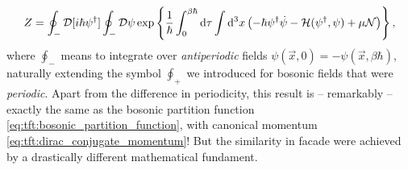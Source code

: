 \begin{equation}
	Z = \oint_- \mathcal{D} [i \hbar \psi^\dagger] \oint_- \mathcal{D} \psi \exp \left\{ \frac{1}{\hbar} \int_0^{\beta \hbar} \mathop{}\!\mathrm{d} \tau \int \mathop{}\!\mathrm{d}^3 x \left( -\hbar \psi^\dagger \dot{\psi} - \mathcal{H} ( \psi^\dagger, \psi ) + \mu \mathcal{N} \right) \right\} ,
\label{eq:tft:fermion_partition_function}
\end{equation}
where $\oint_-$ means to integrate over \emph{antiperiodic} fields $\psi(\vec{x}, 0) = -\psi(\vec{x}, \beta \hbar)$, naturally extending the symbol $\oint_+$ we introduced for bosonic fields that were \emph{periodic}.
Apart from the difference in periodicity, this result is -- remarkably -- exactly the same as the bosonic partition function \eqref{eq:tft:bosonic_partition_function}, with canonical momentum \eqref{eq:tft:dirac_conjugate_momentum}!
But the similarity in facade were achieved by a drastically different mathematical fundament.


\iffalse
The partition function is therefore
\begin{equation}
\begin{split}
	Z &= \int \dif \psi_0^\dagger \int \dif \psi_0 \, e^{-\psi_{n+1}^\dagger \psi_{n+1}} \braket{-\psi_0 | e^{-\beta(\hat{H} - \mu \hat{N})} | \psi_0} \\
	  &= \prod_n \int \dif \psi_n^\dagger \int \dif \psi_n \, e^{-\psi_{n+1}^\dagger \psi_{n+1}} \braket{\psi_{n+1} | e^{-(\hat{H} - \mu \hat{N}) \Delta \tau / \hbar} | \psi_n} \\
	  &= \prod_n \int \dif \psi_n^\dagger \int \dif \psi_n \, e^{-\psi_{n+1}^\dagger \psi_{n+1}} \braket{\psi_{n+1} | \psi_n} e^{-(H_n - \mu N) \Delta \tau / \hbar} \\
	  &= \prod_n \int \dif \psi_n^\dagger \int \dif \psi_n \, \exp \left\{ -\frac{\Delta t}{\hbar} \sum_n \int \dif^3 x \left( \psi^\dagger_{n+1} \frac{\psi_{n+1} - \psi_n}{\Delta t} + \ham - \mu \numdensity \right) \right\} \\
	  &= \oint_- \pathintdif \psi^\dagger \oint_- \pathintdif \psi \exp \left\{ \frac{1}{\hbar} \int_0^{\beta \hbar} \dif \tau \int \dif^3 x \left( -\psi^\dagger(\vec{x},\tau) \dot{\psi}(\vec{x},\tau) - \ham \left( \psi^\dagger(\vec{x},\tau), \psi(\vec{x},\tau) \right) + \mu \numdensity \right) \right\} \\
\end{split}
\end{equation}
\fi

